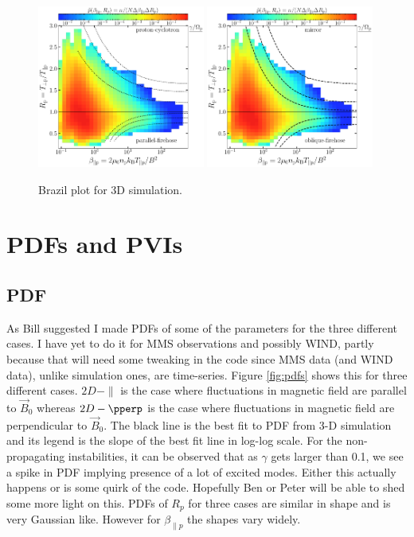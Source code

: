 \documentclass[column]{aastex62}
\begin{document}
		\begin{figure}
			\begin{center}
				\includegraphics[width=0.49\textwidth]{brazil_prob_pic_parallel.pdf}
				\includegraphics[width=0.49\textwidth]{brazil_prob_pic_oblique.pdf}
				\caption{Brazil plot for 3D simulation.}
				\label{fig:brz3d}
			\end{center}
		\end{figure}

    \clearpage
	\section{PDFs and PVIs} \label{sec:pdf}
	
	    \subsection{PDF} \label{sec:pdf}
    	    As Bill suggested I made PDFs of some of the parameters for the three different cases. I have yet to do it for MMS observations and possibly WIND, partly because that will need some tweaking in the code since MMS data (and WIND data), unlike simulation ones, are time-series. Figure \ref{fig:pdfs} shows this for three different cases. $2D-\parallel$ is the case where fluctuations in magnetic field are parallel to $\Vec{B}_0$ whereas $2D-\pperp$ is the case where fluctuations in magnetic field are perpendicular to $\Vec{B}_0$. The black line is the best fit to PDF from 3-D simulation and its legend is the slope of the best fit line in log-log scale. For the non-propagating instabilities, it can be observed that as $\gamma$ gets larger than 0.1, we see a spike in PDF implying presence of a lot of excited modes. Either this actually happens or is some quirk of the code. Hopefully Ben or Peter will be able to shed some more light on this. PDFs of $R_p$ for three cases are similar in shape and is very Gaussian like. However for $\beta_{\parallel p}$ the shapes vary widely.\\
\end{document}
